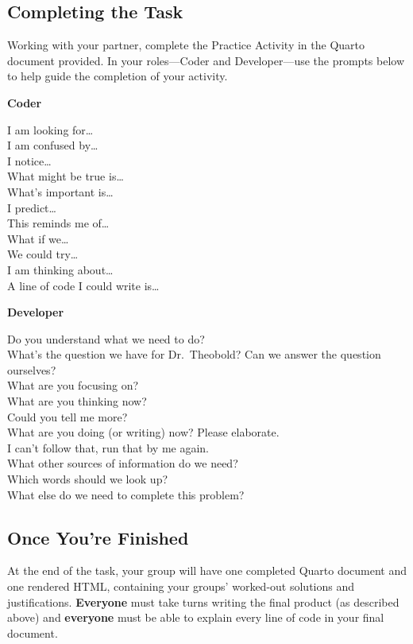 \documentclass[
  letterpaper,
  DIV=11,
  numbers=noendperiod]{scrartcl}
\begin{document}
\subsection{Completing the Task}\label{completing-the-task}

Working with your partner, complete the Practice Activity in the Quarto
document provided. In your roles---Coder and Developer---use the prompts
below to help guide the completion of your activity.

\textbf{Coder}

I am looking for\ldots{}\\
I am confused by\ldots{}\\
I notice\ldots{}\\
What might be true is\ldots{}\\
What's important is\ldots{}\\
I predict\ldots{}\\
This reminds me of\ldots{}\\
What if we\ldots{}\\
We could try\ldots{}\\
I am thinking about\ldots{}\\
A line of code I could write is\ldots{}

\textbf{Developer}

Do you understand what we need to do?\\
What's the question we have for Dr.~Theobold? Can we answer the question
ourselves?\\
What are you focusing on?\\
What are you thinking now?\\
Could you tell me more?\\
What are you doing (or writing) now? Please elaborate.\\
I can't follow that, run that by me again.\\
What other sources of information do we need?\\
Which words should we look up?\\
What else do we need to complete this problem?

\subsection{Once You're Finished}\label{once-youre-finished}

At the end of the task, your group will have one completed Quarto
document and one rendered HTML, containing your groups' worked-out
solutions and justifications. \textbf{Everyone} must take turns writing
the final product (as described above) and \textbf{everyone} must be
able to explain every line of code in your final document.
\end{document}
